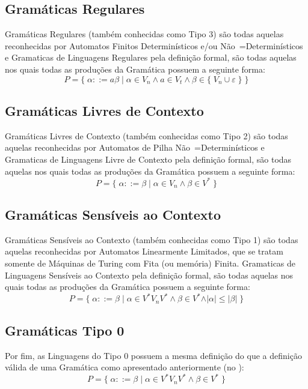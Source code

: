 {\subsection*{Gramáticas Regulares}

    Gramáticas Regulares (também conhecidas como Tipo 3) são todas aquelas reconhecidas
    por Automatos Finitos Determinísticos e/ou Não~=Determinísticos e
    Gramaticas de Linguagens Regulares pela definição formal,
    são todas aquelas nos quais todas as produções da Gramática possuem a seguinte forma:
    $$ P = \{\; \alpha ::= a \beta \;|\; \alpha \in V_n \land a \in V_t
                \land \beta \in \{\; V_n \cup \varepsilon\; \} \;\} $$

\subsection*{Gramáticas Livres de Contexto}

    Gramáticas Livres de Contexto (também conhecidas como Tipo 2) são todas
    aquelas reconhecidas por Automatos de Pilha Não~=Determinísticos e
    Gramaticas de Linguagens Livre de Contexto pela definição formal,
    são todas aquelas nos quais todas as produções da Gramática possuem a seguinte forma:
    $$ P = \{\; \alpha ::= \beta \;|\; \alpha \in V_n \land \beta \in V^* \;\} $$


\subsection*{Gramáticas Sensíveis ao Contexto}

    Gramáticas Sensíveis ao Contexto (também conhecidas como Tipo 1) são
    todas aquelas reconhecidas por Automatos Linearmente Limitados,
    que se tratam somente de Máquinas de Turing com Fita (ou memória) Finita.
    Gramaticas de Linguagens Sensíveis ao Contexto pela definição formal,
    são todas aquelas nos quais todas as produções da Gramática possuem a seguinte forma:
    $$ P = \{\; \alpha ::= \beta \;|\; \alpha \in V^* V_n V^* \land \beta \in V^*
                \land \vert\alpha\vert \leq \vert\beta\vert \;\} $$


\subsection*{Gramáticas Tipo 0}

    Por fim,
    as Linguagens do Tipo 0 possuem a mesma definição do que a definição
    válida de uma Gramática como apresentado anteriormente (no
    ):
    $$ P = \{\; \alpha ::= \beta \;|\; \alpha \in V^* V_n V^* \land \beta \in V^* \;\} $$

}

